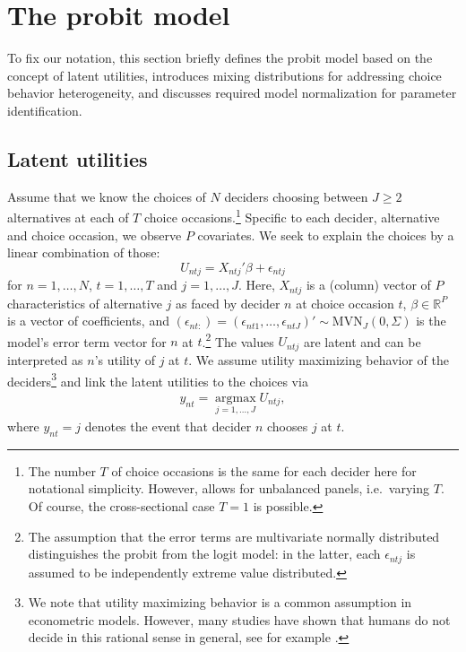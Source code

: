 \documentclass[article]{jss}
\begin{document}
\section{The probit model} \label{sec:probit_model}

To fix our notation, this section briefly defines the probit model based on the concept of latent utilities, introduces mixing distributions for addressing choice behavior heterogeneity, and discusses required model normalization for parameter identification.

\subsection{Latent utilities} \label{subsec:latent_utilities}

Assume that we know the choices of $N$ deciders choosing between $J \geq 2$ alternatives at each of $T$ choice occasions.\footnote{The number $T$ of choice occasions is the same for each decider here for notational simplicity. However,  allows for unbalanced panels, i.e.\ varying $T$. Of course, the cross-sectional case $T = 1$ is possible.} Specific to each decider, alternative and choice occasion, we observe $P$ covariates. We seek to explain the choices by a linear combination of those:
\begin{equation}
  \label{eq:utility}
  U_{ntj} = X_{ntj}'\beta + \epsilon_{ntj}
\end{equation}
for $n=1,\dots,N$, $t=1,\dots,T$ and $j=1,\dots,J$. Here, $X_{ntj}$ is a (column) vector of $P$ characteristics of alternative $j$ as faced by decider $n$ at choice occasion $t$, $\beta \in {\mathbb R}^{P}$ is a vector of coefficients, and $(\epsilon_{nt:}) = (\epsilon_{nt1},\dots,\epsilon_{ntJ})' \sim \text{MVN}_{J} (0,\Sigma)$ is the model's error term vector for $n$ at $t$.\footnote{The assumption that the error terms are multivariate normally distributed distinguishes the probit from the logit model: in the latter, each $\epsilon_{ntj}$ is assumed to be independently extreme value distributed.} The values $U_{ntj}$ are latent and can be interpreted as $n$'s utility of $j$ at $t$. We assume utility maximizing behavior of the deciders\footnote{We note that utility maximizing behavior is a common assumption in econometric models. However, many studies have shown that humans do not decide in this rational sense in general, see for example \cite{Hewig:2011}.} and link the latent utilities to the choices via
\begin{align*}
   y_{nt} = \operatorname*{argmax}_{j = 1,\dots,J} U_{ntj},
\end{align*}
where $y_{nt}=j$ denotes the event that decider $n$ chooses $j$ at $t$.
\end{document}
